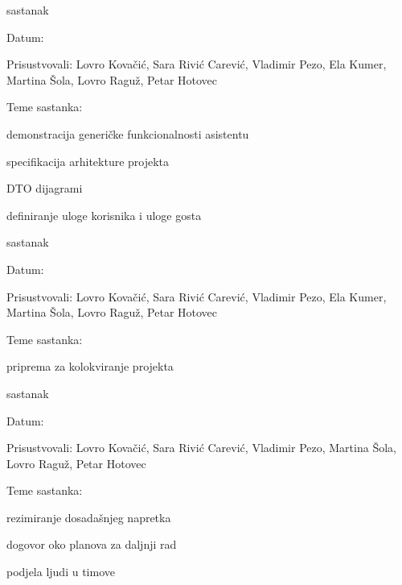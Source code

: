 \begin{packed_enum}
			\item  sastanak
			\item[] \begin{packed_item}
				\item Datum: 
				\item Prisustvovali: Lovro Kovačić, Sara Rivić Carević, Vladimir Pezo, Ela Kumer, Martina Šola, Lovro Raguž, Petar Hotovec
				\item Teme sastanka:
				\begin{packed_item}
				    \item  demonstracija generičke funkcionalnosti asistentu
				    \item  specifikacija arhitekture projekta
				    \item  DTO dijagrami
				    \item  definiranje uloge korisnika i uloge gosta
				\end{packed_item}
			\end{packed_item}
			
			\item  sastanak
			\item[] \begin{packed_item}
				\item Datum: \DTMdisplaydate{2022}{12}{8}{-1}
				\item Prisustvovali: Lovro Kovačić, Sara Rivić Carević, Vladimir Pezo, Ela Kumer, Martina Šola, Lovro Raguž, Petar Hotovec
				\item Teme sastanka:
				\begin{packed_item}
				    \item  priprema za kolokviranje projekta
				\end{packed_item}
			\end{packed_item}
			
            \item  sastanak
			\item[] \begin{packed_item}
				\item Datum: \DTMdisplaydate{2022}{12}{15}{-1}
				\item Prisustvovali: Lovro Kovačić, Sara Rivić Carević, Vladimir Pezo, Martina Šola, Lovro Raguž, Petar Hotovec
				\item Teme sastanka:
				\begin{packed_item}
				    \item  rezimiranje dosadašnjeg napretka
				    \item  dogovor oko planova za daljnji rad
				    \item  podjela ljudi u timove
				\end{packed_item}
			\end{packed_item}
			

\end{packed_enum}
